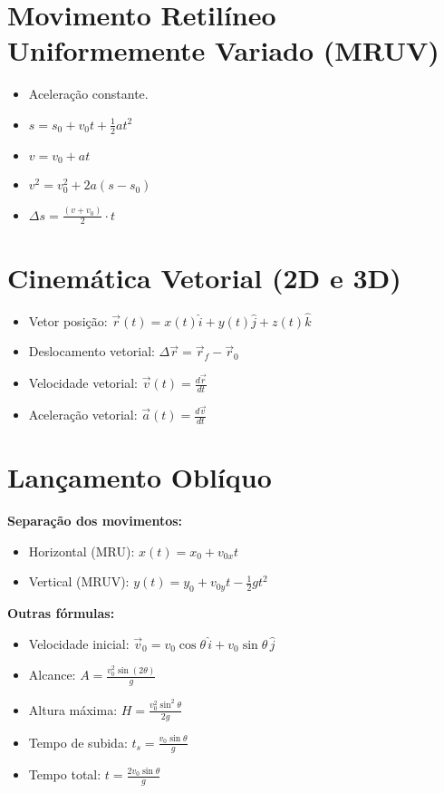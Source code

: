 \documentclass[a4paper,12pt]{article}
\begin{document}
\begin{multicols}{2}
\section{Movimento Retilíneo Uniformemente Variado (MRUV)}
\begin{itemize}
  \item Aceleração constante.
  \item $s = s_0 + v_0 t + \frac{1}{2} a t^2$
  \item $v = v_0 + a t$
  \item $v^2 = v_0^2 + 2a(s - s_0)$
  \item $\Delta s = \frac{(v + v_0)}{2} \cdot t$
\end{itemize}

\section{Cinemática Vetorial (2D e 3D)}
\begin{itemize}
  \item Vetor posição: $\vec{r}(t) = x(t)\hat{i} + y(t)\hat{j} + z(t)\hat{k}$
  \item Deslocamento vetorial: $\Delta \vec{r} = \vec{r}_f - \vec{r}_0$
  \item Velocidade vetorial: $\vec{v}(t) = \frac{d\vec{r}}{dt}$
  \item Aceleração vetorial: $\vec{a}(t) = \frac{d\vec{v}}{dt}$
\end{itemize}

\section{Lançamento Oblíquo}
\textbf{Separação dos movimentos:}
\begin{itemize}
  \item Horizontal (MRU): $x(t) = x_0 + v_{0x} t$
  \item Vertical (MRUV): $y(t) = y_0 + v_{0y} t - \frac{1}{2} g t^2$
\end{itemize}

\textbf{Outras fórmulas:}
\begin{itemize}
  \item Velocidade inicial: $\vec{v}_0 = v_0 \cos\theta\,\hat{i} + v_0 \sin\theta\,\hat{j}$
  \item Alcance: $A = \frac{v_0^2 \sin(2\theta)}{g}$
  \item Altura máxima: $H = \frac{v_0^2 \sin^2\theta}{2g}$
  \item Tempo de subida: $t_s = \frac{v_0 \sin\theta}{g}$
  \item Tempo total: $t = \frac{2 v_0 \sin\theta}{g}$
\end{itemize}


\end{multicols}
\end{document}
